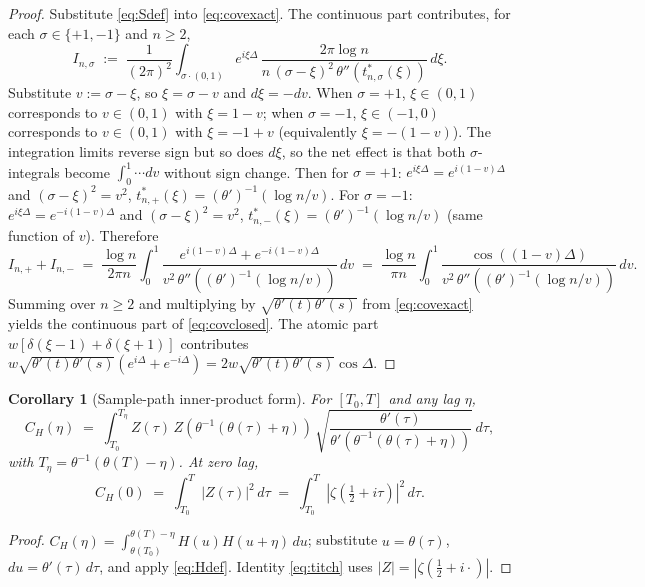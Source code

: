 \documentclass[11pt]{amsart}
\newtheorem{corollary}[theorem]{Corollary}
\theoremstyle{definition}
\begin{document}
\begin{proof}
Substitute \eqref{eq:Sdef} into \eqref{eq:covexact}. The continuous part
contributes, for each $\sigma\in\{+1,-1\}$ and $n\ge 2$,
\[
I_{n,\sigma} \;:=\; \frac{1}{(2\pi)^{2}}\int_{\sigma\cdot(0,1)}e^{i\xi\Delta}\,\frac{2\pi\log n}{n\,(\sigma-\xi)^{2}\,\theta''(t^{*}_{n,\sigma}(\xi))}\,d\xi.
\]
Substitute $v:=\sigma-\xi$, so $\xi=\sigma-v$ and $d\xi=-dv$. When
$\sigma=+1$, $\xi\in(0,1)$ corresponds to $v\in(0,1)$ with $\xi=1-v$;
when $\sigma=-1$, $\xi\in(-1,0)$ corresponds to $v\in(0,1)$ with
$\xi=-1+v$ (equivalently $\xi=-(1-v)$). The integration limits reverse
sign but so does $d\xi$, so the net effect is that both $\sigma$-integrals
become $\int_{0}^{1}\cdots dv$ without sign change. Then for
$\sigma=+1$: $e^{i\xi\Delta}=e^{i(1-v)\Delta}$ and $(\sigma-\xi)^{2}=v^{2}$,
$t^{*}_{n,+}(\xi)=(\theta')^{-1}(\log n/v)$. For $\sigma=-1$:
$e^{i\xi\Delta}=e^{-i(1-v)\Delta}$ and $(\sigma-\xi)^{2}=v^{2}$,
$t^{*}_{n,-}(\xi)=(\theta')^{-1}(\log n/v)$ (same function of $v$).
Therefore
\[
I_{n,+}+I_{n,-} \;=\; \frac{\log n}{2\pi n}\int_{0}^{1}\!\!\frac{e^{i(1-v)\Delta}+e^{-i(1-v)\Delta}}{v^{2}\,\theta''((\theta')^{-1}(\log n/v))}\,dv
\;=\; \frac{\log n}{\pi n}\int_{0}^{1}\!\!\frac{\cos((1-v)\Delta)}{v^{2}\,\theta''((\theta')^{-1}(\log n/v))}\,dv.
\]
Summing over $n\ge 2$ and multiplying by $\sqrt{\theta'(t)\theta'(s)}$
from \eqref{eq:covexact} yields the continuous part of \eqref{eq:covclosed}.
The atomic part $w[\delta(\xi-1)+\delta(\xi+1)]$ contributes
$w\sqrt{\theta'(t)\theta'(s)}(e^{i\Delta}+e^{-i\Delta})=2w\sqrt{\theta'(t)\theta'(s)}\cos\Delta$.
\end{proof}

\begin{corollary}[Sample-path inner-product form]\label{cor:sample}
For $[T_{0},T]$ and any lag $\eta$,
\begin{equation}\label{eq:samplepath}
C_{H}(\eta) \;=\; \int_{T_{0}}^{T_{\eta}} Z(\tau)\,Z(\theta^{-1}(\theta(\tau)+\eta))\,\sqrt{\frac{\theta'(\tau)}{\theta'(\theta^{-1}(\theta(\tau)+\eta))}}\,d\tau,
\end{equation}
with $T_{\eta}=\theta^{-1}(\theta(T)-\eta)$. At zero lag,
\begin{equation}\label{eq:titch}
C_{H}(0) \;=\; \int_{T_{0}}^{T}|Z(\tau)|^{2}\,d\tau \;=\; \int_{T_{0}}^{T}\left|\zeta\!\left(\tfrac{1}{2}+i\tau\right)\right|^{2}\,d\tau.
\end{equation}
\end{corollary}

\begin{proof}
$C_{H}(\eta)=\int_{\theta(T_{0})}^{\theta(T)-\eta}H(u)H(u+\eta)\,du$;
substitute $u=\theta(\tau)$, $du=\theta'(\tau)\,d\tau$, and apply
\eqref{eq:Hdef}. Identity \eqref{eq:titch} uses $|Z|=|\zeta(\tfrac12+i\cdot)|$.
\end{proof}
\end{document}
